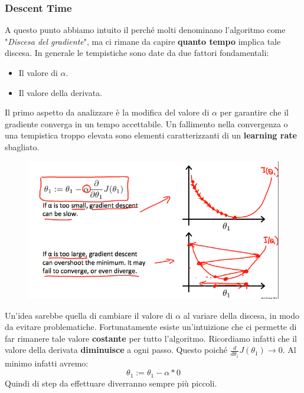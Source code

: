 \subsubsection{Descent Time}
A questo punto abbiamo intuito il perché molti denominano l'algoritmo come "\textit{Discesa del gradiente}", ma ci rimane da capire \textbf{quanto tempo} implica tale discesa.
In generale le tempistiche sono date da due fattori fondamentali:
\begin{itemize}
    \item Il valore di $\alpha$.
    \item Il valore della derivata.
\end{itemize}
Il primo aspetto da analizzare è la modifica del valore di $\alpha$ per garantire che il gradiente converga in un tempo accettabile. Un fallimento nella convergenza o una tempistica troppo elevata sono elementi caratterizzanti di un \textbf{learning rate} sbagliato.
\begin{figure}[h!]
    \centering
    \includegraphics[width=1\textwidth]{img/UJpiD6GWEeai9RKvXdDYag_3c3ad6625a2a4ec8456f421a2f4daf2e_Screenshot-2016-11-03-00.05.27.png}
    \caption{}\label{GradientDescent3}
\end{figure}
Un'idea sarebbe quella di cambiare il valore di $\alpha$ al variare della discesa, in modo da evitare problematiche. Fortunatamente esiste un'intuizione che ci permette di far rimanere tale valore \textbf{costante} per tutto l'algoritmo. Ricordiamo infatti che il valore della derivata \textbf{diminuisce} a ogni passo. Questo poiché $\frac{d}{d\theta_1} J(\theta_1) \to 0$. Al minimo infatti avremo: 
\[\theta_1:=\theta_1-\alpha * 0\]
Quindi di step da effettuare diverranno sempre più piccoli.
